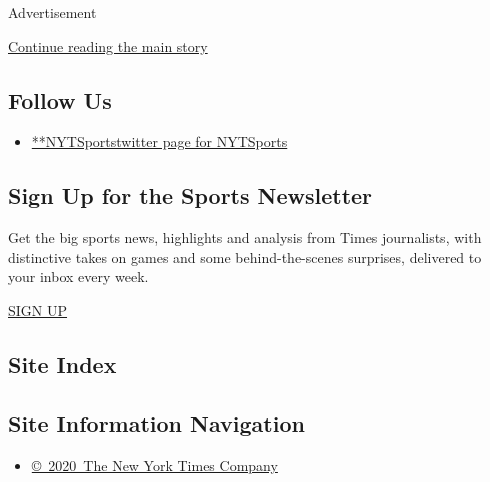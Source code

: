 Advertisement

\protect\hyperlink{after-mktg}{Continue reading the main story}

\hypertarget{follow-us}{%
\subsection{Follow Us}\label{follow-us}}

\begin{itemize}
\tightlist
\item
  \href{https://twitter.com/NYTSports}{**NYTSportstwitter page for
  NYTSports}
\end{itemize}

\hypertarget{sign-up-for-the-sports-newsletter}{%
\subsection{Sign Up for the Sports
Newsletter}\label{sign-up-for-the-sports-newsletter}}

Get the big sports news, highlights and analysis from Times journalists,
with distinctive takes on games and some behind-the-scenes surprises,
delivered to your inbox every week.

\href{/newsletters/signup/SP}{SIGN UP}

\hypertarget{site-index}{%
\subsection{Site Index}\label{site-index}}

\hypertarget{site-information-navigation}{%
\subsection{Site Information
Navigation}\label{site-information-navigation}}

\begin{itemize}
\tightlist
\item
  \href{https://help.nytimes.com/hc/en-us/articles/115014792127-Copyright-notice}{©~2020~The
  New York Times Company}
\end{itemize}

